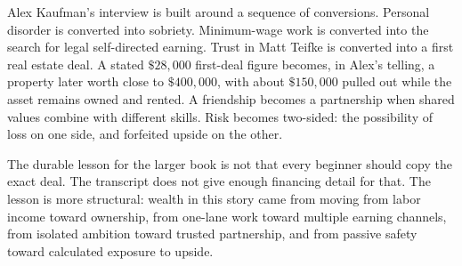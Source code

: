 Alex Kaufman's interview is built around a sequence of conversions. Personal disorder is converted into sobriety. Minimum-wage work is converted into the search for legal self-directed earning. Trust in Matt Teifke is converted into a first real estate deal. A stated \(\$28{,}000\) first-deal figure becomes, in Alex's telling, a property later worth close to \(\$400{,}000\), with about \(\$150{,}000\) pulled out while the asset remains owned and rented. A friendship becomes a partnership when shared values combine with different skills. Risk becomes two-sided: the possibility of loss on one side, and forfeited upside on the other.

The durable lesson for the larger book is not that every beginner should copy the exact deal. The transcript does not give enough financing detail for that. The lesson is more structural: wealth in this story came from moving from labor income toward ownership, from one-lane work toward multiple earning channels, from isolated ambition toward trusted partnership, and from passive safety toward calculated exposure to upside.